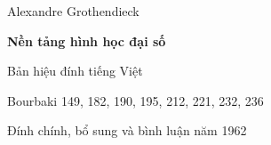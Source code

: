 \documentclass[11pt,twoside,openany]{book}
\begin{document}
\frontmatter
\begin{titlepage}
\centering\vspace*{2cm}
{\Large Alexandre Grothendieck\par}\vspace{1.5cm}
{\Huge\bfseries Nền tảng hình học đại số\par}\vspace{1.2cm}
{\Large Bản hiệu đính tiếng Việt\par}
\vfill
{Bourbaki 149, 182, 190, 195, 212, 221, 232, 236\par}
{Đính chính, bổ sung và bình luận năm 1962\par}
\end{titlepage}

\tableofcontents
\mainmatter

















\end{document}
